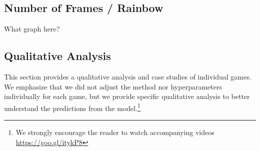 


\subsection{Number of Frames / Rainbow}\label{qualitative_analysis}

What graph here?





\subsection{Qualitative Analysis}\label{qualitative_analysis}
This section provides a qualitative analysis and case studies of individual games. We emphasize that we did not adjust the method nor hyperparameters individually for each game, but we provide specific qualitative analysis to better understand the predictions from the model.\footnote{We strongly encourage the reader to watch accompanying videos \url{https://goo.gl/itykP8}} 

